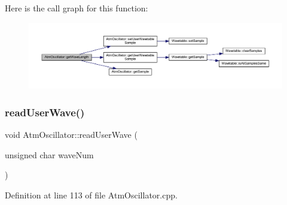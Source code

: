 Here is the call graph for this function\+:
\nopagebreak
\begin{figure}[H]
\begin{center}
\leavevmode
\includegraphics[width=350pt]{d8/d5f/class_atm_oscillator_ad846116dfd6f232cae79ada35dddadfd_cgraph}
\end{center}
\end{figure}
\mbox{\label{class_atm_oscillator_a08b383cd2305c232de827399aa8d2ccb}} 
\subsubsection{\texorpdfstring{read\+User\+Wave()}{readUserWave()}}
{\footnotesize\ttfamily void Atm\+Oscillator\+::read\+User\+Wave (\begin{DoxyParamCaption}\item[{unsigned char}]{wave\+Num }\end{DoxyParamCaption})}



Definition at line 113 of file Atm\+Oscillator.\+cpp.

